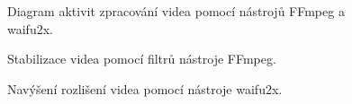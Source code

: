 \begin{figure}[t!]
\vspace{-10pt}

\caption{Diagram aktivit zpracování videa pomocí nástrojů FFmpeg a waifu2x.}
\label{fig:ffmpeg-waifu2x}
\end{figure}

\begin{figure}[H]

\caption{Stabilizace videa pomocí filtrů nástroje FFmpeg.}
\label{fig:vidstabdetect-vidstabtransform}
\end{figure}%

\begin{figure}[b!]

\caption{Navýšení rozlišení videa pomocí nástroje waifu2x.}
\label{fig:waifu2x}
\end{figure}%

